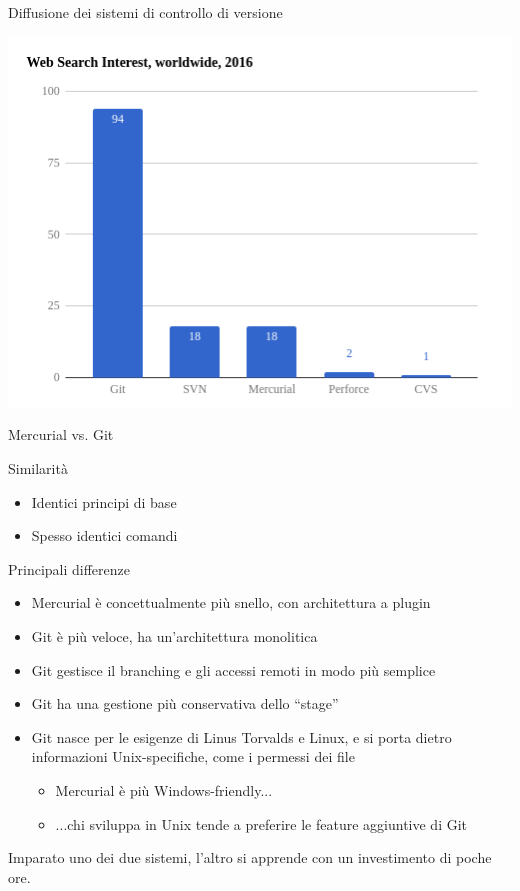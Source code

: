 \documentclass[presentation]{beamer}
\begin{document}
\begin{frame}[allowframebreaks]{Diffusione dei sistemi di controllo di versione}
\begin{center}
        \includegraphics[width=\textwidth, height=.77\textheight, keepaspectratio]{img/search} \\
    \end{center}
\end{frame}

\begin{frame}{Mercurial vs. Git}
	\begin{block}{Similarità}
		\begin{itemize}
			\item Identici principi di base
			\item Spesso identici comandi
		\end{itemize}
	\end{block}
	\begin{block}{Principali differenze}
		\begin{itemize}
			\item Mercurial è concettualmente più snello, con architettura a plugin
			\item Git è più veloce, ha un'architettura monolitica
			\item Git gestisce il branching e gli accessi remoti in modo più semplice
			\item Git ha una gestione più conservativa dello ``stage''
			\item Git nasce per le esigenze di Linus Torvalds e Linux, e si porta dietro 
informazioni Unix-specifiche, come i permessi dei file
			\begin{itemize}
				\item Mercurial è più Windows-friendly...
				\item ...chi sviluppa in Unix tende a preferire le feature aggiuntive di Git
			\end{itemize}
		\end{itemize}
	\end{block}
	Imparato uno dei due sistemi, l'altro si apprende con un investimento di poche ore.
\end{frame}
\end{document}
